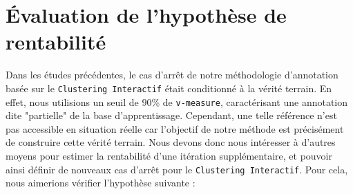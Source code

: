 \section{Évaluation de l'hypothèse de rentabilité}
\label{section:4.5-HYPOTHESE-RENTABILITE}

	Dans les études précédentes, le cas d'arrêt de notre méthodologie d'annotation basée sur le \texttt{Clustering Interactif} était conditionné à la vérité terrain.
	En effet, nous utilisions un seuil de $90$\% de \texttt{v-measure}, caractérisant une annotation dite "partielle" de la base d'apprentissage.
	Cependant, une telle référence n'est pas accessible en situation réelle car l'objectif de notre méthode est précisément de construire cette vérité terrain.
	Nous devons donc nous intéresser à d'autres moyens pour estimer la rentabilité d'une itération supplémentaire, et pouvoir ainsi définir de nouveaux cas d'arrêt pour le \texttt{Clustering Interactif}.
	Pour cela, nous aimerions vérifier l'hypothèse suivante :
	
